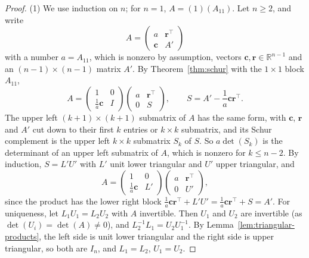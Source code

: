 \documentclass[11pt]{article}
\theoremstyle{definition}
\theoremstyle{plain}
\theoremstyle{remark}
\begin{document}
\begin{proof}
    (1) We use induction on $n$; for $n = 1$, $A = (1)(A_{11})$. Let $n \geq 2$, and write
    \[A = \begin{pmatrix} a & \mathbf{r}^\top \\ \mathbf{c} & A' \end{pmatrix}\]
    with a number $a = A_{11}$, which is nonzero by assumption, vectors $\mathbf{c}, \mathbf{r} \in \mathbb{R}^{n-1}$ and an $(n - 1) \times (n - 1)$ matrix $A'$. By Theorem~\ref{thm:schur} with the $1 \times 1$ block $A_{11}$,
    \[A = \begin{pmatrix} 1 & 0 \\ \frac{1}{a}\mathbf{c} & I \end{pmatrix}\begin{pmatrix} a & \mathbf{r}^\top \\ 0 & S \end{pmatrix}, \qquad S = A' - \frac{1}{a}\mathbf{c}\mathbf{r}^\top.\]
    The upper left $(k + 1) \times (k + 1)$ submatrix of $A$ has the same form, with $\mathbf{c}$, $\mathbf{r}$ and $A'$ cut down to their first $k$ entries or $k \times k$ submatrix, and its Schur complement is the upper left $k \times k$ submatrix $S_k$ of $S$. So $a\det(S_k)$ is the determinant of an upper left submatrix of $A$, which is nonzero for $k \leq n - 2$. By induction, $S = L'U'$ with $L'$ unit lower triangular and $U'$ upper triangular, and
    \[A = \begin{pmatrix} 1 & 0 \\ \frac{1}{a}\mathbf{c} & L' \end{pmatrix}\begin{pmatrix} a & \mathbf{r}^\top \\ 0 & U' \end{pmatrix},\]
    since the product has the lower right block $\frac{1}{a}\mathbf{c}\mathbf{r}^\top + L'U' = \frac{1}{a}\mathbf{c}\mathbf{r}^\top + S = A'$. For uniqueness, let $L_1U_1 = L_2U_2$ with $A$ invertible. Then $U_1$ and $U_2$ are invertible (as $\det(U_i) = \det(A) \neq 0$), and $L_2^{-1}L_1 = U_2U_1^{-1}$. By Lemma~\ref{lem:triangular-products}, the left side is unit lower triangular and the right side is upper triangular, so both are $I_n$, and $L_1 = L_2$, $U_1 = U_2$.


\end{proof}
\end{document}
